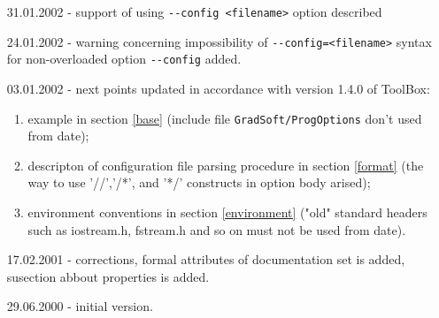 \documentclass[10pt]{article}
\begin{document}
\begin{itemize}
  \item[31.01.2002] - support of using \verb|--config <filename>| option described
  \item[24.01.2002] - warning concerning impossibility of \verb|--config=<filename>| syntax
                      for non-overloaded option \verb|--config| added.
  \item[03.01.2002] - next points updated in accordance with version 1.4.0 of ToolBox:
                      \begin{enumerate}
                      \item example in section \ref{base}
                            (include file \verb|GradSoft/ProgOptions| don't used from date);
                      \item descripton of configuration file parsing procedure in section \ref{format}
                            (the way to use '//','/*', and '*/' constructs in option body arised); 
                      \item environment conventions in section \ref{environment}
                            ("old" standard headers such as iostream.h, fstream.h and so on
                            must not be used from date).
                      \end{enumerate}
  \item[17.02.2001] - corrections, formal attributes of documentation set is added, susection abbout properties is added.
  \item[29.06.2000] - initial version. 
\end{itemize}
\end{document}
